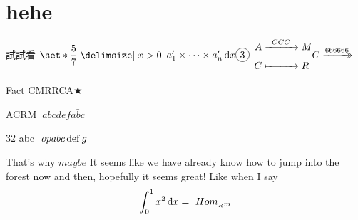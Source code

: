 \tableofcontents
\section{hehe}
試試看
$\set*{\dfrac{5}{7} \mid x > 0}$
$\rng* na\times\d x\circled{3}$
$\maps AM[CCC]CRC\xtwoheadrightarrow{666666}$
\begin{stm}{Fact}
CMRRCA$\bigstar$
\end{stm}
ACRM
$~abc def\bar{abc}$
\begin{enumerate*}[label = \protect\circled{\arabic*}]
    \item 32 abc $~op a{b c} \OP def g$ 
\end{enumerate*}
That's why $\displaystyle maybe$
It seems like we have already know how to jump into the forest now and then, hopefully it seems great! Like when I say 
\[\int_0^1 x^2\mathop{}\!\mathrm d x=~Hom _{{_R}m}\]
